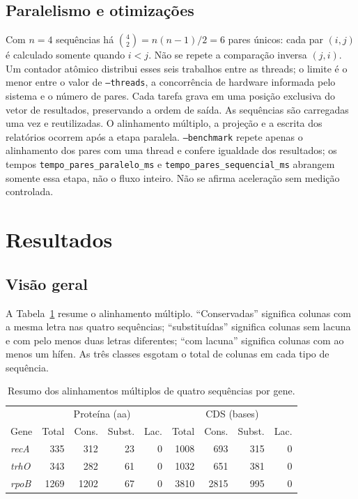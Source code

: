 \documentclass[12pt]{article}
\begin{document}
\subsection{Paralelismo e otimizações}

Com $n=4$ sequências há $\binom{4}{2}=n(n-1)/2=6$ pares únicos: cada par
$(i,j)$ é calculado somente quando $i<j$. Não se repete a comparação inversa
$(j,i)$. Um contador atômico distribui esses seis trabalhos entre as threads;
o limite é o menor entre o valor de \texttt{--threads}, a concorrência de
hardware informada pelo sistema e o número de pares. Cada tarefa grava em
uma posição exclusiva do vetor de resultados, preservando a ordem de saída.
As sequências são carregadas uma vez e reutilizadas. O alinhamento múltiplo,
a projeção e a escrita dos relatórios ocorrem após a etapa paralela.
\texttt{--benchmark} repete apenas o alinhamento dos pares com uma thread e
confere igualdade dos resultados; os tempos \texttt{tempo\_pares\_paralelo\_ms}
e \texttt{tempo\_pares\_sequencial\_ms} abrangem somente essa etapa, não o fluxo
inteiro. Não se afirma aceleração sem medição controlada.

\section{Resultados}

\subsection{Visão geral}

A Tabela~\ref{tab:resumo} resume o alinhamento múltiplo. ``Conservadas''
significa colunas com a mesma letra nas quatro sequências; ``substituídas''
significa colunas sem lacuna e com pelo menos duas letras diferentes; ``com
lacuna'' significa colunas com ao menos um hífen. As três classes esgotam o
total de colunas em cada tipo de sequência.

\begin{table}[ht]
\centering\small
\caption{Resumo dos alinhamentos múltiplos de quatro sequências por gene.}
\label{tab:resumo}
\begin{tabular}{lrrrrrrrr}
\hline
& \multicolumn{4}{c}{Proteína (aa)} & \multicolumn{4}{c}{CDS (bases)} \\
Gene & Total & Cons. & Subst. & Lac. & Total & Cons. & Subst. & Lac. \\
\hline
\textit{recA} & 335 & 312 & 23 & 0 & 1008 & 693 & 315 & 0 \\
\textit{trhO} & 343 & 282 & 61 & 0 & 1032 & 651 & 381 & 0 \\
\textit{rpoB} & 1269 & 1202 & 67 & 0 & 3810 & 2815 & 995 & 0 \\
\hline
\end{tabular}
\end{table}
\end{document}
